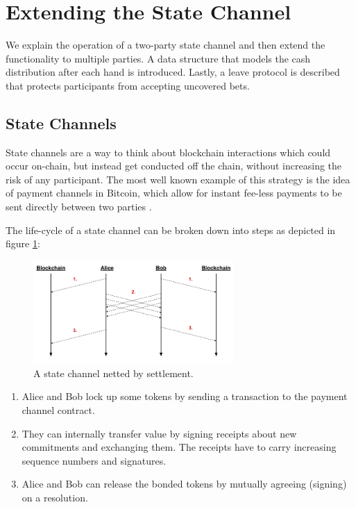 \section{Extending the State Channel}

We explain the operation of a two-party state channel and then extend the functionality to multiple parties. A data structure that models the cash distribution after each hand is introduced. Lastly, a leave protocol is described that protects participants from accepting uncovered bets. 


\subsection{State Channels}
State channels are a way to think about blockchain interactions which could occur on-chain, but instead get conducted off the chain, without  increasing the risk of any participant. The most well known example of this strategy is the idea of payment channels in Bitcoin, which allow for instant fee-less payments to be sent directly between two parties \cite{coleman15}. 

The life-cycle of a state channel can be broken down into steps as depicted in figure \ref{pc_settle}:

\begin{figure}[!ht]
\centering
\includegraphics[width=3.0in]{images/settle.png}
\caption{A state channel netted by settlement.}
\label{pc_settle}
\end{figure}

\begin{enumerate}
\item Alice and Bob lock up some tokens by sending a transaction to the payment channel contract.
\item They can internally transfer value by signing receipts about new commitments and exchanging them. The receipts have to carry increasing sequence numbers and signatures.
\item Alice and Bob can release the bonded tokens by mutually agreeing (signing) on a resolution.
\end{enumerate}

